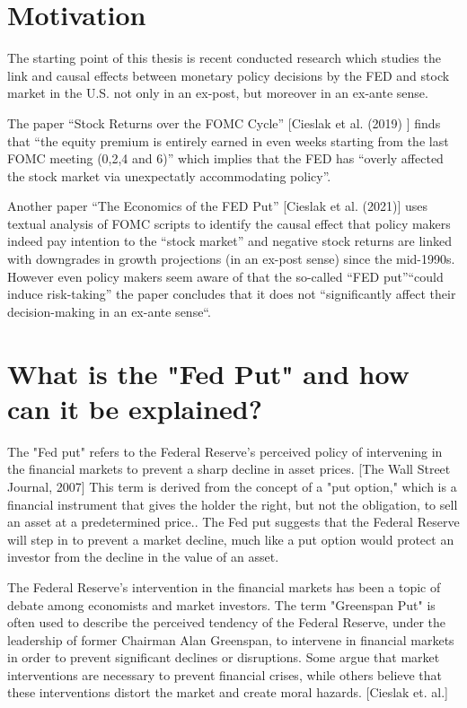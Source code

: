 
\chapter{Motivation}

The starting point of this thesis is recent conducted research which studies the link and causal effects between monetary policy decisions by the FED and stock market in the U.S. not only in an ex-post, but moreover in an ex-ante sense.

The paper “Stock Returns over the FOMC Cycle” [Cieslak et al.  (2019) ] finds that “the equity premium is entirely earned in even weeks starting from the last FOMC meeting (0,2,4 and 6)” which implies that the FED has “overly affected the stock market via unexpectatly accommodating policy”.

Another paper “The Economics of the FED Put”  [Cieslak et al.  (2021)] uses textual analysis of FOMC scripts to identify the causal effect that policy makers indeed pay intention to the “stock market” and negative stock returns are linked with downgrades in growth projections (in an ex-post sense) since the mid-1990s.  However even policy makers seem aware of that the so-called “FED put”“could induce risk-taking” the paper concludes that it does not “significantly affect their decision-making in an ex-ante sense“.


\chapter{What is the "Fed Put" and how can it be explained?}

The "Fed put" refers to the Federal Reserve's perceived policy of intervening in the financial markets to prevent a sharp decline in asset prices.  [The Wall Street Journal,  2007]
This term is derived from the concept of a "put option," which is a financial instrument that gives the holder the right, but not the obligation,  to sell an asset at a predetermined price..
The Fed put suggests that the Federal Reserve will step in to prevent a market decline,  much like a put option would protect an investor from the decline in the value of an asset. 

The Federal Reserve's intervention in the financial markets has been a topic of debate among economists and market investors. 
The term "Greenspan Put" is often used to describe the perceived tendency of the Federal Reserve,  under the leadership of former Chairman Alan Greenspan,  to intervene in financial markets in order to prevent significant declines or disruptions. 
Some argue that market interventions are necessary to prevent financial crises,  while others believe that these interventions distort the market and create moral hazards.  
\cite{Cie21} [Cieslak et. al.]

